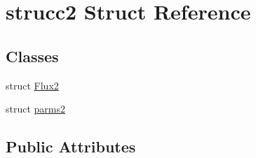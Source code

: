 \hypertarget{structstrucc2}{\section{strucc2 Struct Reference}
\label{structstrucc2}
}
\subsection*{Classes}
\begin{DoxyCompactItemize}
\item 
struct \hyperlink{structstrucc2_1_1_flux2}{Flux2}
\item 
struct \hyperlink{structstrucc2_1_1parms2}{parms2}
\end{DoxyCompactItemize}
\subsection*{Public Attributes}
